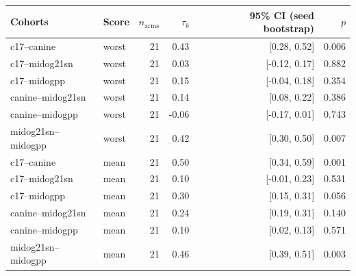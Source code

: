 \begin{tabular}{llrrrr}
\toprule
Cohorts & Score & $n_\text{arms}$ & $\tau_b$ & 95\% CI (seed bootstrap) & $p$ \\
\midrule
c17--canine & worst & 21 & 0.43 & [0.28, 0.52] & 0.006 \\
c17--midog21sn & worst & 21 & 0.03 & [-0.12, 0.17] & 0.882 \\
c17--midogpp & worst & 21 & 0.15 & [-0.04, 0.18] & 0.354 \\
canine--midog21sn & worst & 21 & 0.14 & [0.08, 0.22] & 0.386 \\
canine--midogpp & worst & 21 & -0.06 & [-0.17, 0.01] & 0.743 \\
midog21sn--midogpp & worst & 21 & 0.42 & [0.30, 0.50] & 0.007 \\
c17--canine & mean & 21 & 0.50 & [0.34, 0.59] & 0.001 \\
c17--midog21sn & mean & 21 & 0.10 & [-0.01, 0.23] & 0.531 \\
c17--midogpp & mean & 21 & 0.30 & [0.15, 0.31] & 0.056 \\
canine--midog21sn & mean & 21 & 0.24 & [0.19, 0.31] & 0.140 \\
canine--midogpp & mean & 21 & 0.10 & [0.02, 0.13] & 0.571 \\
midog21sn--midogpp & mean & 21 & 0.46 & [0.39, 0.51] & 0.003 \\
\bottomrule
\end{tabular}
